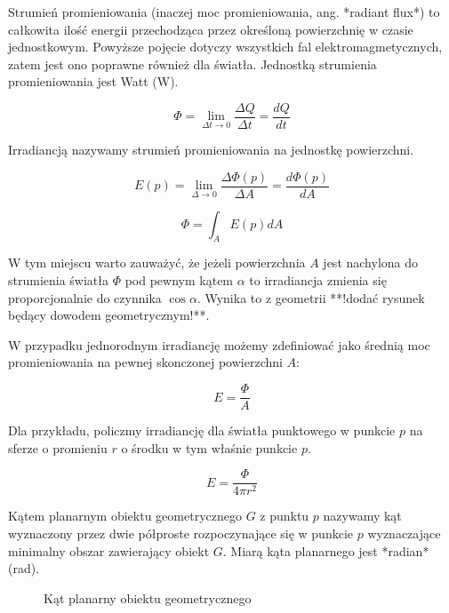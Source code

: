 \documentclass[../main.tex]{subfiles}
\begin{document}
Strumień promieniowania (inaczej moc promieniowania, ang. *radiant flux*) to
całkowita ilość energii przechodząca przez określoną powierzchnię w czasie
jednostkowym. Powyższe pojęcie dotyczy wszystkich fal elektromagmetycznych,
zatem jest ono poprawne również dla światła. Jednostką strumienia
promieniowania jest Watt ($\text{W}$).

$$
\Phi = \lim_{\Delta t \rightarrow 0}{
    \frac{\Delta Q}{\Delta t}=\frac{dQ}{dt}
}
$$

Irradiancją nazywamy strumień promieniowania na jednostkę powierzchni.

$$
E(p) =
    \lim_{\Delta \rightarrow 0} {
        \frac{\Delta \Phi(p)}{\Delta A}
    } =
    \frac{d\Phi(p)}{dA}
$$

$$
\Phi = \int_{A} {
    E(p)
    dA
}
$$

W tym miejscu warto zauważyć, że jeżeli powierzchnia $A$ jest nachylona do
strumienia światła $\Phi$ pod pewnym kątem $\alpha$ to irradiancja zmienia się
proporcjonalnie do czynnika $\cos \alpha$. Wynika to z geometrii **!dodać
rysunek będący dowodem geometrycznym!**.

W przypadku jednorodnym irradiancję możemy zdefiniować jako średnią moc
promieniowania na pewnej skonczonej powierzchni $A$:

$$
E = \frac{\Phi}{A}
$$

Dla przykładu, policzmy irradiancję dla światła punktowego w punkcie $p$ na
sferze o promieniu $r$ o środku w tym właśnie punkcie $p$.

$$ E = \frac{\Phi}{4 \pi r^2} $$

Kątem planarnym obiektu geometrycznego $G$ z punktu $p$ nazywamy kąt wyznaczony
przez dwie półproste rozpoczynające się w punkcie $p$ wyznaczające minimalny
obszar zawierający obiekt $G$. Miarą kąta planarnego jest *radian* (rad).

\begin{figure}[ht]
  \centering
  \caption{Kąt planarny obiektu geometrycznego}
  \label{fig:PlanarAngle}
\end{figure}
\end{document}

